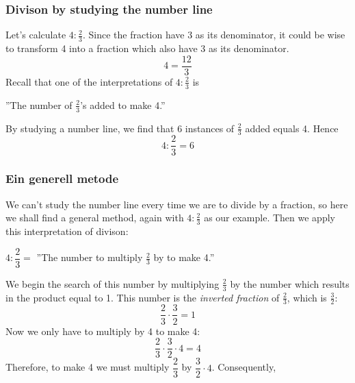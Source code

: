 \section{\brdelmbr}
\subsubsection{Divison by studying the number line}
Let's calculate $ 4:\frac{2}{3}  $. Since the fraction have 3 as its denominator, it could be wise to transform 4 into a fraction which also have $ 3 $ as its denominator.
\[ 4=\dfrac{12}{3} \]
Recall that one of the interpretations of $ 4:\frac{2}{3} $ is
\begin{center}
	''The number of $ \frac{2}{3}$'s added to make 4.''
\end{center}
By studying a number line, we find that 6 instances of $ \frac{2}{3} $ added equals 4. Hence
\[ 4:\frac{2}{3}=6 \]
\newpage
\subsubsection{Ein generell metode}
We can't study the number line every time we are to divide by a fraction, so here we shall find a general method, again with $ 4:\frac{2}{3} $ as our example. Then we apply this interpretation of divison:
\begin{center}
	$  4:\dfrac{2}{3}= $ ''The number to multiply $ \frac{2}{3} $ by to make 4.''
\end{center}
We begin the search of this number by multiplying $ \frac{2}{3} $ by the number which results in the product equal to 1. This number is the \textit{inverted fraction} of $ \frac{2}{3} $, which is $ \frac{3}{2} $:
\[ \frac{2}{3}\cdot\frac{3}{2}=1 \]
Now we only have to multiply by 4 to make 4:
\[ \frac{2}{3}\cdot\frac{3}{2}\cdot4=4 \]
Therefore, to make 4 we must multiply $ \dfrac{2}{3} $ by $ \dfrac{3}{2}\cdot4 $. Consequently,
\reg[\delmbr \label{delmbr}]{
When dividing a number by a fraction, we multiply the number by the inverted fraction.
}
\newpage
{}
\newpage
